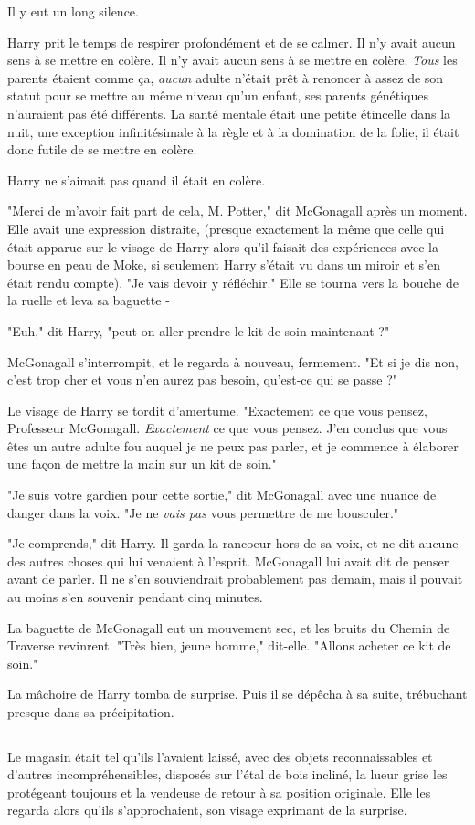 Il y eut un long silence.

Harry prit le temps de respirer profondément et de se calmer. Il n'y avait aucun sens à se mettre en colère. Il n'y avait aucun sens à se mettre en colère. \emph{Tous}  les parents étaient comme ça, \emph{aucun}  adulte n'était prêt à renoncer à assez de son statut pour se mettre au même niveau qu'un enfant, ses parents génétiques n'auraient pas été différents. La santé mentale était une petite étincelle dans la nuit, une exception infinitésimale à la règle et à la domination de la folie, il était donc futile de se mettre en colère.

Harry ne s'aimait pas quand il était en colère.

"Merci de m'avoir fait part de cela, M. Potter," dit McGonagall après un moment. Elle avait une expression distraite, (presque exactement la même que celle qui était apparue sur le visage de Harry alors qu'il faisait des expériences avec la bourse en peau de Moke, si seulement Harry s'était vu dans un miroir et s'en était rendu compte). "Je vais devoir y réfléchir." Elle se tourna vers la bouche de la ruelle et leva sa baguette -

"Euh," dit Harry, "peut-on aller prendre le kit de soin maintenant ?"

McGonagall s'interrompit, et le regarda à nouveau, fermement. "Et si je dis non, c'est trop cher et vous n'en aurez pas besoin, qu'est-ce qui se passe ?"

Le visage de Harry se tordit d'amertume. "Exactement ce que vous pensez, Professeur McGonagall. \emph{Exactement}  ce que vous pensez. J'en conclus que vous êtes un autre adulte fou auquel je ne peux pas parler, et je commence à élaborer une façon de mettre la main sur un kit de soin."

"Je suis votre gardien pour cette sortie," dit McGonagall avec une nuance de danger dans la voix. "Je ne \emph{vais pas}  vous permettre de me bousculer."

"Je comprends," dit Harry. Il garda la rancoeur hors de sa voix, et ne dit aucune des autres choses qui lui venaient à l'esprit. McGonagall lui avait dit de penser avant de parler. Il ne s'en souviendrait probablement pas demain, mais il pouvait au moins s'en souvenir pendant cinq minutes.

La baguette de McGonagall eut un mouvement sec, et les bruits du Chemin de Traverse revinrent. "Très bien, jeune homme," dit-elle. "Allons acheter ce kit de soin."

La mâchoire de Harry tomba de surprise. Puis il se dépêcha à sa suite, trébuchant presque dans sa précipitation.
\par\noindent\rule{\textwidth}{0.4pt}
Le magasin était tel qu'ils l'avaient laissé, avec des objets reconnaissables et d'autres incompréhensibles, disposés sur l'étal de bois incliné, la lueur grise les protégeant toujours et la vendeuse de retour à sa position originale. Elle les regarda alors qu'ils s'approchaient, son visage exprimant de la surprise.

